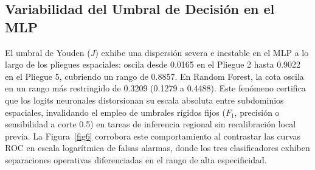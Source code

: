\documentclass[10pt,twocolumn,a4paper]{article}
\begin{document}
\begin{table}[htbp]
\centering
\caption{Desempeño por pliegue bajo el Protocolo B (Buffer 500~m).}
\label{tab2}
\end{table}

\subsection{Variabilidad del Umbral de Decisión en el MLP}
El umbral de Youden ($J$) exhibe una dispersión severa e inestable en el MLP a lo largo de los pliegues espaciales: oscila desde 0.0165 en el Pliegue 2 hasta 0.9022 en el Pliegue 5, cubriendo un rango de 0.8857. En Random Forest, la cota oscila en un rango más restringido de 0.3209 (0.1279 a 0.4488). Este fenómeno certifica que los logits neuronales distorsionan su escala absoluta entre subdominios espaciales, invalidando el empleo de umbrales rígidos fijos ($F_1$, precisión o sensibilidad a corte 0.5) en tareas de inferencia regional sin recalibración local previa. La Figura~\ref{fig6} corrobora este comportamiento al contrastar las curvas ROC en escala logarítmica de falsas alarmas, donde los tres clasificadores exhiben separaciones operativas diferenciadas en el rango de alta especificidad.
\end{document}
